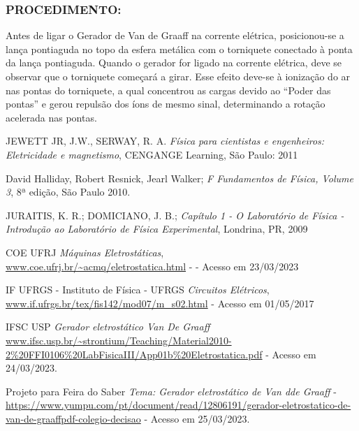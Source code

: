 \subsubsection{PROCEDIMENTO: }
Antes de ligar o Gerador de Van de Graaff na corrente elétrica, posicionou-se a lança pontiaguda no topo 
da esfera metálica com o torniquete conectado à ponta da lança pontiaguda. 
Quando o gerador for ligado na corrente elétrica, deve se observar que o torniquete começará a girar. 
Esse efeito deve-se à ionização do ar nas pontas do torniquete, a qual concentrou as cargas 
devido ao “Poder das pontas” e gerou repulsão dos íons de mesmo sinal, determinando a rotação 
acelerada nas pontas. 


\begin{thebibliography}{9}

  JEWETT JR, J.W., SERWAY, R. A. 
  \emph{Física para cientistas e engenheiros: Eletricidade e magnetismo},
  CENGANGE Learning,
  São Paulo:
  2011

David Halliday, Robert Resnick, Jearl Walker; \emph{F Fundamentos de Física, Volume 3}, 8ª edição, São Paulo 2010. 
 
JURAITIS, K. R.; DOMICIANO, J. B.; \emph{Capítulo 1 - O Laboratório de Física - Introdução ao Laboratório de Física Experimental}, Londrina, PR, 2009

COE UFRJ 
\emph{Máquinas Eletrostáticas}, \\ \url{www.coe.ufrj.br/~acmq/eletrostatica.html} -  - Acesso em 23/03/2023

IF UFRGS - Instituto de Física - UFRGS
\emph{Circuitos Elétricos}, \\ \url{www.if.ufrgs.br/tex/fis142/mod07/m\_s02.html} - Acesso em 01/05/2017

IFSC USP
\emph{Gerador eletrostático Van De Graaff}
\\ \url{www.ifsc.usp.br/~strontium/Teaching/Material2010-2\%20FFI0106\%20LabFisicaIII/App01b\%20Eletrostatica.pdf} - Acesso em 24/03/2023.

Projeto para Feira do Saber \emph{Tema: Gerador eletrostático de Van dde Graaff} - 
\\ \url{https://www.yumpu.com/pt/document/read/12806191/gerador-eletrostatico-de-van-de-graaffpdf-colegio-decisao} - Acesso em 25/03/2023.
  
\end{thebibliography}
